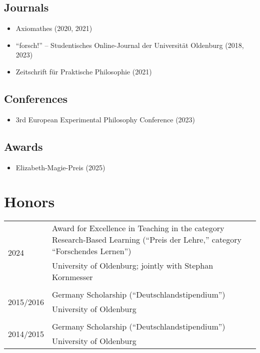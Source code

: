 \documentclass[a4paper,10pt]{article}
\begin{document}
\subsection*{Journals}
\begin{itemize}
   \item Axiomathes (2020, 2021)
   \item \enquote{forsch!} -- Studentisches Online-Journal der Universität Oldenburg (2018, 2023)
   \item Zeitschrift für Praktische Philosophie (2021)
\end{itemize}


\subsection*{Conferences}
\begin{itemize}
   \item 3rd European Experimental Philosophy Conference (2023)
\end{itemize}


\subsection*{Awards}
\begin{itemize}
   \item Elizabeth-Magie-Preis (2025)
\end{itemize}


\clearpage
\section{Honors}
\begin{longtable}{p{2.5cm}p{11cm}}
\multirow{2}{2.5cm}{\footnotesize{2024}} & Award for Excellence in Teaching in the category Research-Based Learning (\enquote{Preis der Lehre,} category \enquote{Forschendes Lernen})\\
& \footnotesize{University of Oldenburg; jointly with Stephan Kornmesser}\\
\\
\multirow{2}{2.5cm}{\footnotesize{2015/2016}} & Germany Scholarship (\enquote{Deutschlandstipendium})\\
& \footnotesize{University of Oldenburg}\\
\\
\multirow{2}{2.5cm}{\footnotesize{2014/2015}} & Germany Scholarship (\enquote{Deutschlandstipendium})\\
& \footnotesize{University of Oldenburg}\\
\end{longtable}
\end{document}
